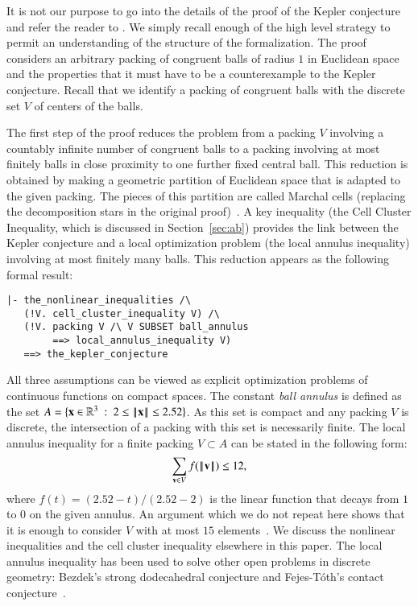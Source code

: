 It is not our purpose to go into the details of the proof of the
Kepler conjecture and refer the reader to \cite{DSP}.  We simply
recall enough of the high level strategy to permit an understanding of
the structure of the formalization.  The proof considers an arbitrary
packing of congruent balls of radius $1$ in Euclidean space and the
properties that it must have to be a counterexample to the Kepler
conjecture.  Recall that we identify a packing of congruent balls with
the discrete set $V$ of centers of the balls.

The first step of the proof reduces the problem from a packing $V$
involving a countably infinite number of congruent balls to a packing
involving at most finitely balls in close proximity to one further
fixed central ball.  This reduction is obtained by making a geometric
partition of Euclidean space that is adapted to the given packing.
The pieces of this partition are called Marchal cells (replacing the
decomposition stars in the original proof)~\cite{marchal:2009}.  A key
inequality (the Cell Cluster Inequality, which is discussed in
Section~\ref{sec:ab}) provides the link between the Kepler conjecture
and a local optimization problem (the local annulus inequality)
involving at most finitely many balls.  This reduction appears as the
following formal result:


\begin{verbatim}
|- the_nonlinear_inequalities /\ 
   (!V. cell_cluster_inequality V) /\
   (!V. packing V /\ V SUBSET ball_annulus 
        ==> local_annulus_inequality V) 
   ==> the_kepler_conjecture
\end{verbatim}
All three assumptions can be viewed as explicit optimization problems
of continuous functions on compact spaces.
The constant {\it ball annulus} is defined as the set
$A=\{{\bf x}\in\mathbb{R}^3 \ :\  2\le {\hbox{\ensuremath{\hspace{0.1em}|\hspace{-0.1em}|\hspace{0.1em}}}{\bf x}\hbox{\ensuremath{\hspace{0.1em}|\hspace{-0.1em}|\hspace{0.1em}}}} \le 2.52\}$.  As this set is
compact and any packing $V$ is discrete, the intersection of a packing
with this set is necessarily finite.   The local annulus inequality for a finite
packing $V\subset A$ can be stated in the following form:
\begin{equation}\label{eqn:la}
\sum_{{\mathbf v}\in V} f({\hbox{\ensuremath{\hspace{0.1em}|\hspace{-0.1em}|\hspace{0.1em}}}{\mathbf v}\hbox{\ensuremath{\hspace{0.1em}|\hspace{-0.1em}|\hspace{0.1em}}}})  \le 12,
\end{equation}
where $f(t) = (2.52-t)/(2.52-2)$ is the linear function that decays
from $1$ to $0$ on the given annulus.  An argument which we do not
repeat here shows that it is enough to consider $V$ with at most $15$
elements~\cite[Lemma~6.110]{DSP}.  We discuss the nonlinear
inequalities and the cell cluster inequality elsewhere in this paper.
The local annulus inequality has been used to solve other open
problems in discrete geometry: Bezdek's strong dodecahedral conjecture
and Fejes-T\'oth's contact conjecture~\cite{hales2011strong}.

